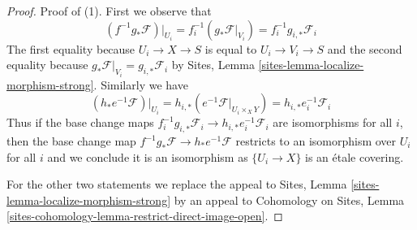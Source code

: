 \documentclass[10pt,a4paper]{amsart}
\theoremstyle{plain}
\theoremstyle{definition}
\theoremstyle{remark}
\numberwithin{equation}{subsection}
\begin{document}
\begin{proof}
Proof of (1). First we observe that
$$
(f^{-1}g_*\mathcal{F})|_{U_i} =
f_i^{-1}(g_*\mathcal{F}|_{V_i}) =
f_i^{-1}g_{i, *}\mathcal{F}_i
$$
The first equality because $U_i \to X \to S$ is equal to
$U_i \to V_i \to S$ and the second equality because
$g_*\mathcal{F}|_{V_i} = g_{i, *}\mathcal{F}_i$ by
Sites, Lemma \ref{sites-lemma-localize-morphism-strong}.
Similarly we have
$$
(h_*e^{-1}\mathcal{F})|_{U_i} =
h_{i, *}(e^{-1}\mathcal{F}|_{U_i \times_X Y}) =
h_{i, *}e_i^{-1}\mathcal{F}_i
$$
Thus if the base change maps
$f_i^{-1}g_{i, *}\mathcal{F}_i \to h_{i, *}e_i^{-1}\mathcal{F}_i$
are isomorphisms for all $i$, then the base change map
$f^{-1}g_*\mathcal{F} \to h_*e^{-1}\mathcal{F}$
restricts to an isomorphism over $U_i$ for all $i$
and we conclude it is an isomorphism as $\{U_i \to X\}$
is an \'etale covering.

\medskip\noindent
For the other two statements we replace the appeal to
Sites, Lemma \ref{sites-lemma-localize-morphism-strong}
by an appeal to
Cohomology on Sites, Lemma
\ref{sites-cohomology-lemma-restrict-direct-image-open}.
\end{proof}
\end{document}
